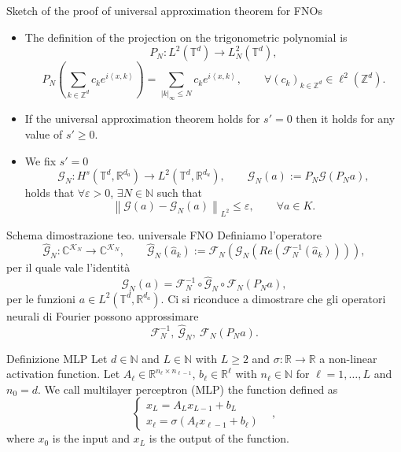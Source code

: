 \documentclass{beamer}
\newcommand{\numberset}{\mathbb}
\newcommand{\N}{\numberset{N}}
\newcommand{\Z}{\numberset{Z}}
\newcommand{\R}{\numberset{R}}
\newcommand{\C}{\numberset{C}}
\begin{document}

\begin{frame}[noframenumbering]{Sketch of the proof of universal approximation theorem for FNOs}
	\centering
	\begin{itemize}
		\item The definition of the projection on the trigonometric polynomial is
		\[ P_N: L^{2}(\mathbb{T}^d) \to L^{2}_N(\mathbb{T}^d),  \]
		\[ P_N\left(\sum_{k \in \Z^d} c_k e^{i \left\langle x, k \right\rangle } \right) = \sum_{|k|_{\infty}\le N} c_k e^{i \left\langle x, k \right\rangle }, \qquad \forall (c_k)_{k \in \Z^d} \in \ell^2(\Z^d). \]
		\item If the universal approximation theorem holds for $ s'=0 $ then it holds for any value of $ s' \ge 0 $.
		\item We fix $ s' = 0 $  \[ \mathcal{G}_{N}: H^{s}(\mathbb{T}^d, \R^{d_a}) \to L^2(\mathbb{T}^d, \R^{d_u}), \qquad \mathcal{G}_{N}(a):= P_N  \mathcal{G} (P_Na), \]
		holds that $ \forall \varepsilon > 0 $, $ \exists N \in \N $ such that
		\[ \left\|\mathcal{G}(a) - \mathcal{G}_N(a) \right\|_{L^2} \le \varepsilon, \qquad \forall a \in K. \]
	\end{itemize}
\end{frame}


\begin{frame}[noframenumbering]{Schema dimostrazione teo. universale FNO}
	Definiamo l'operatore
	\[ \widehat{\mathcal{G}}_N: \C^{\mathcal{K}_N} \to\C^{\mathcal{K}_N}, \qquad \widehat{\mathcal{G}}_N(\widehat{a}_k) := \mathcal{F}_N (\mathcal{G}_N ( Re (\mathcal{F}_N^{-1}(\widehat{a}_k)))), \]
	per il quale vale l'identità
	\[ \mathcal{G}_N (a) = \mathcal{F}_N^{-1} \circ \widehat{\mathcal{G}}_N \circ \mathcal{F}_N (P_Na), \]
	per le funzioni $  a \in L^2(\mathbb{T}^d, \R^{d_a}) $. Ci si riconduce a dimostrare che gli operatori neurali di Fourier possono approssimare
	\[ \mathcal{F}_N^{-1}, \ \widehat{\mathcal{G}}_N , \ \mathcal{F}_N (P_Na). \]
\end{frame}


\begin{frame}[noframenumbering]{Definizione MLP}
	Let $ d \in \N $ and $ L\in \N $ with $ L \ge 2 $ and $ \sigma : \R \to \R  $ a non-linear activation function. Let $ A_{\ell} \in \R^{n_{\ell}\times n_{\ell-1}} $, $ b_{\ell} \in \R^{\ell} $ with $ n_{\ell}\in \N $ for $ \ell = 1, \dots, L $	and $ n_{0} = d $. We call multilayer perceptron (MLP) the function defined as
	\[ \begin{cases}
		x_{L} = A_{L}x_{L-1} + b_{L} \qquad & \\
		x_{\ell} = \sigma\left( A_{\ell}x_{\ell-1} + b_{\ell} \right) 
	\end{cases}, \]
	where $ x_0 $ is the input and $ x_{L} $ is the output of the function.
\end{frame}
\end{document}
